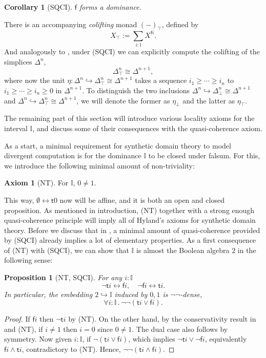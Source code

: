 \documentclass[12pt]{amsart}
\newtheorem{corollary}[theorem]{Corollary}
\newtheorem{proposition}[theorem]{Proposition}
\theoremstyle{definition}
\newtheorem*{axiom}{Axiom}
\newcommand{\mbb}[1]{\mathbb{#1}}
\newcommand{\I}{\mbb I}
\newcommand{\ms}[1]{\mathsf{#1}}
\newcommand{\hook}{\hookrightarrow}
\newcommand{\dneg}{\neg\neg}
\newcommand{\prt}{_{\bot}}
\newcommand{\cprt}{_{\top}}
\newcommand{\fa}[2]{\forall #1\!\colon\!\!#2\mathpunct{.}}
\newcommand{\emp}{\emptyset}
\newcommand{\eq}{\leftrightarrow}
\begin{document}
\begin{corollary}[SQCI]
  $\ms f$ forms a dominance.
\end{corollary}

There is an accompanying \emph{colifting} monad $(-)\cprt$, defined by
\[ X\cprt := \sum_{i:\I} X^{\ms fi}. \]
And analogously to , under (SQCI) we can explicitly compute the colifting of the simplices $\Delta^n$,
\[ \Delta^n\cprt \cong \Delta^{n+1}, \]
where now the unit $\eta : \Delta^n \hook \Delta^n\cprt \cong \Delta^{n+1}$ takes a sequence $i_1 \ge \cdots \ge i_n$ to $i_1 \ge \cdots \ge i_n \ge 0$ in $\Delta^{n+1}$. To distinguish the two inclusions $\Delta^n \hook \Delta^n\prt \cong \Delta^{n+1}$ and $\Delta^n \hook \Delta^{n}\cprt \cong \Delta^{n+1}$, we will denote the former as $\eta\prt$ and the latter as $\eta\cprt$.

The remaining part of this section will introduce various locality axioms for the interval $\I$, and discuss some of their consequences with the quasi-coherence axiom.

As a start, a minimal requirement for synthetic domain theory to model divergent computation is for the dominance $\I$ to be closed under falsum. For this, we introduce the following minimal amount of non-triviality:

\begin{axiom}[NT]\label{ax:nt}
  For $\I$, $0 \neq 1$.
\end{axiom}


This way, $\emp \eq \ms t0$ now will be affine, and it is both an open and closed proposition. As mentioned in introduction, (NT) together with a strong enough quasi-coherence principle will imply all of Hyland's axioms for synthetic domain theory. Before we discuss that in , a minimal amount of quasi-coherence provided by (SQCI) already implies a lot of elementary properties. As a first consequence of (NT) with (SQCI), we can show that $\I$ is almost the Boolean algebra $2$ in the following sense:

\begin{proposition}[NT, SQCI]\label{prop:filed}
  For any $i : \I$ 
  \[ \neg \ms ti \eq \ms fi, \quad \neg\ms fi \eq \ms ti. \]
  In particular, the embedding $2 \hook \I$ induced by $0,1$ is $\neg\neg$-dense,
  \[ \fa i\I \dneg(\ms ti \vee \ms fi). \]
\end{proposition}
\begin{proof}
  If $\ms fi$ then $\neg\ms ti$ by (NT). On the other hand, by the conservativity result in  and (NT), if $i \neq 1$ then $i = 0$ since $0 \neq 1$. The dual case also follows by symmetry. Now given $i :\I$, if $\neg(\ms ti \vee \ms fi)$, which implies $\neg\ms ti \vee \neg\ms fi$, equivalently $\ms fi \wedge \ms ti$, contradictory to (NT). Hence, $\neg\neg(\ms ti \wedge \ms fi)$.
\end{proof}
\end{document}
